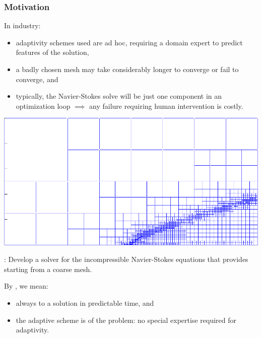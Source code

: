 \documentclass[mathserif]{beamer}
\newcommand{\pecosbold}[1]{{\color{pecos2}{#1}}}
\begin{document}
\begin{frame}
\frametitle{Motivation}
In industry:
\begin{itemize}
\item adaptivity schemes used are ad hoc, requiring a domain expert to predict features of the solution,
\item a badly chosen mesh may take considerably longer to converge or fail to converge, and
\item typically, the Navier-Stokes solve will be just one component in an optimization loop $\implies$ any failure requiring human intervention is costly.
\end{itemize}

\begin{center}
\includegraphics[scale=0.35]{../figures/Jesse/mesh10.png}
\end{center}

\end{frame}

\begin{frame}
\vspace{5mm}
\begin{center}
\pecosbold{Goal}: Develop a solver for the incompressible Navier-Stokes equations that provides \pecosbold{robust adaptivity} starting from a coarse mesh.
\end{center}
\pause
By \pecosbold{robust}, we mean:
\begin{itemize}
\item always \pecosbold{converges} to a solution in predictable time, and
\pause
\item the adaptive scheme is \pecosbold{independent} of the problem: no special expertise required for adaptivity.
\end{itemize}


\end{frame}
\end{document}
